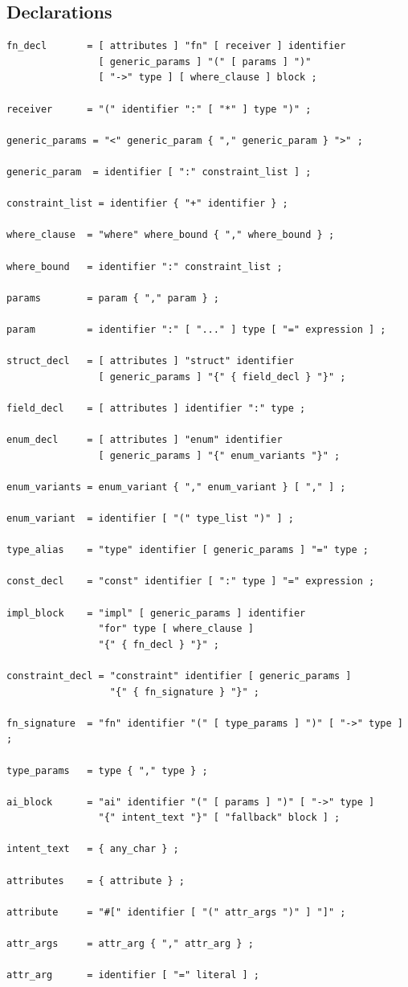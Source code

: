 \subsection{Declarations}

\begin{lstlisting}[language=EBNF]
fn_decl       = [ attributes ] "fn" [ receiver ] identifier
                [ generic_params ] "(" [ params ] ")"
                [ "->" type ] [ where_clause ] block ;

receiver      = "(" identifier ":" [ "*" ] type ")" ;

generic_params = "<" generic_param { "," generic_param } ">" ;

generic_param  = identifier [ ":" constraint_list ] ;

constraint_list = identifier { "+" identifier } ;

where_clause  = "where" where_bound { "," where_bound } ;

where_bound   = identifier ":" constraint_list ;

params        = param { "," param } ;

param         = identifier ":" [ "..." ] type [ "=" expression ] ;

struct_decl   = [ attributes ] "struct" identifier
                [ generic_params ] "{" { field_decl } "}" ;

field_decl    = [ attributes ] identifier ":" type ;

enum_decl     = [ attributes ] "enum" identifier
                [ generic_params ] "{" enum_variants "}" ;

enum_variants = enum_variant { "," enum_variant } [ "," ] ;

enum_variant  = identifier [ "(" type_list ")" ] ;

type_alias    = "type" identifier [ generic_params ] "=" type ;

const_decl    = "const" identifier [ ":" type ] "=" expression ;

impl_block    = "impl" [ generic_params ] identifier
                "for" type [ where_clause ]
                "{" { fn_decl } "}" ;

constraint_decl = "constraint" identifier [ generic_params ]
                  "{" { fn_signature } "}" ;

fn_signature  = "fn" identifier "(" [ type_params ] ")" [ "->" type ] ;

type_params   = type { "," type } ;

ai_block      = "ai" identifier "(" [ params ] ")" [ "->" type ]
                "{" intent_text "}" [ "fallback" block ] ;

intent_text   = { any_char } ;

attributes    = { attribute } ;

attribute     = "#[" identifier [ "(" attr_args ")" ] "]" ;

attr_args     = attr_arg { "," attr_arg } ;

attr_arg      = identifier [ "=" literal ] ;
\end{lstlisting}

